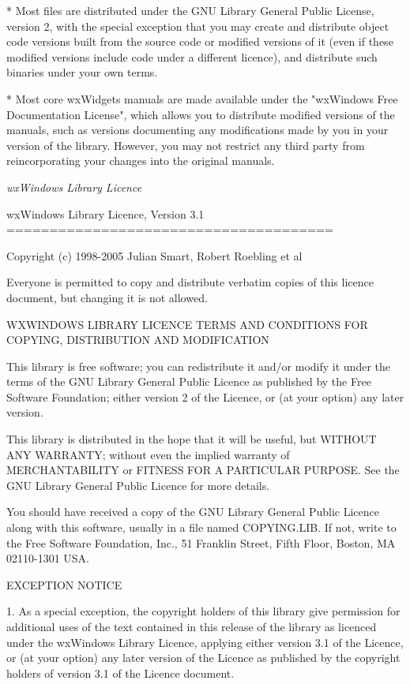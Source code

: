 * Most files are distributed under the GNU Library General Public License,
version 2, with the special exception that you may create and distribute
object code versions built from the source code or modified versions of it
(even if these modified versions include code under a different licence),
and distribute such binaries under your own terms.

* Most core wxWidgets manuals are made available under the "wxWindows Free
Documentation License", which allows you to distribute modified versions of
the manuals, such as versions documenting any modifications made by you in
your version of the library. However, you may not restrict any third party
from reincorporating your changes into the original manuals.

\textit{wxWindows Library Licence}

\begin{center}
	wxWindows Library Licence, Version 3.1
	======================================
\end{center}

Copyright (c) 1998-2005 Julian Smart, Robert Roebling et al

Everyone is permitted to copy and distribute verbatim copies
of this licence document, but changing it is not allowed.

\begin{center}
	WXWINDOWS LIBRARY LICENCE
	TERMS AND CONDITIONS FOR COPYING, DISTRIBUTION AND MODIFICATION
\end{center}

This library is free software; you can redistribute it and/or modify it
under the terms of the GNU Library General Public Licence as published by
the Free Software Foundation; either version 2 of the Licence, or (at your
option) any later version.

This library is distributed in the hope that it will be useful, but WITHOUT
ANY WARRANTY; without even the implied warranty of MERCHANTABILITY or
FITNESS FOR A PARTICULAR PURPOSE.  See the GNU Library General Public
Licence for more details.

You should have received a copy of the GNU Library General Public Licence
along with this software, usually in a file named COPYING.LIB.  If not,
write to the Free Software Foundation, Inc., 51 Franklin Street, Fifth
Floor, Boston, MA 02110-1301 USA.

EXCEPTION NOTICE

1. As a special exception, the copyright holders of this library give
permission for additional uses of the text contained in this release of the
library as licenced under the wxWindows Library Licence, applying either
version 3.1 of the Licence, or (at your option) any later version of the
Licence as published by the copyright holders of version 3.1 of the Licence
document.

